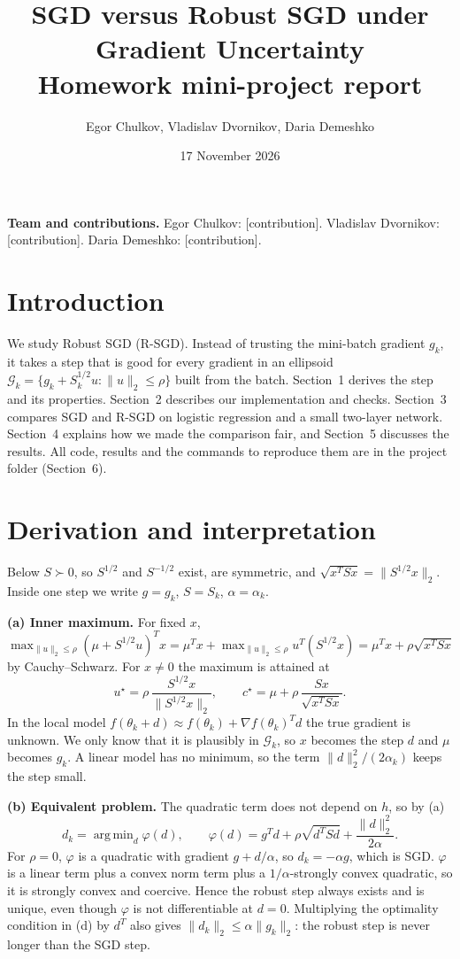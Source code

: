 \documentclass[11pt,a4paper]{article}
\title{SGD versus Robust SGD under Gradient Uncertainty\\[0.2em]\large Homework mini-project report}
\author{Egor Chulkov, Vladislav Dvornikov, Daria Demeshko}
\date{17 November 2026}
\newcommand{\G}{\mathcal{G}_k}
\newcommand{\norm}[1]{\lVert #1\rVert_2}
\DeclareMathOperator*{\argmin}{arg\,min}
\begin{document}
\maketitle

\noindent\textbf{Team and contributions.}
Egor Chulkov: [contribution].
Vladislav Dvornikov: [contribution].
Daria Demeshko: [contribution].

\section*{Introduction}

We study Robust SGD (R-SGD). Instead of trusting the mini-batch gradient $g_k$, it takes a step
that is good for every gradient in an ellipsoid $\G=\{g_k+S_k^{1/2}u:\norm u\le\rho\}$ built from
the batch. Section~1 derives the step and its properties. Section~2 describes our implementation and
checks. Section~3 compares SGD and R-SGD on logistic regression and a small two-layer network.
Section~4 explains how we made the comparison fair, and Section~5 discusses the results. All code,
results and the commands to reproduce them are in the project folder (Section~6).

\section{Derivation and interpretation}

Below $S\succ0$, so $S^{1/2}$ and $S^{-1/2}$ exist, are symmetric, and $\sqrt{x^TSx}=\norm{S^{1/2}x}$.
Inside one step we write $g=g_k$, $S=S_k$, $\alpha=\alpha_k$.

\textbf{(a) Inner maximum.} For fixed $x$,
$\max_{\norm u\le\rho}(\mu+S^{1/2}u)^Tx=\mu^Tx+\max_{\norm u\le\rho}u^T(S^{1/2}x)=\mu^Tx+\rho\sqrt{x^TSx}$
by Cauchy--Schwarz. For $x\ne0$ the maximum is attained at
\begin{equation*}
u^\star=\rho\,\frac{S^{1/2}x}{\norm{S^{1/2}x}},\qquad c^\star=\mu+\rho\,\frac{Sx}{\sqrt{x^TSx}} .
\end{equation*}
In the local model $f(\theta_k+d)\approx f(\theta_k)+\nabla f(\theta_k)^Td$ the true gradient is unknown.
We only know that it is plausibly in $\G$, so $x$ becomes the step $d$ and $\mu$ becomes $g_k$. A
linear model has no minimum, so the term $\norm d^2/(2\alpha_k)$ keeps the step small.

\textbf{(b) Equivalent problem.} The quadratic term does not depend on $h$, so by (a)
\begin{equation*}
d_k=\argmin_d\varphi(d),\qquad \varphi(d)=g^Td+\rho\sqrt{d^TSd}+\frac{\norm d^2}{2\alpha}. \tag{2}
\end{equation*}
For $\rho=0$, $\varphi$ is a quadratic with gradient $g+d/\alpha$, so $d_k=-\alpha g$, which is SGD.
$\varphi$ is a linear term plus a convex norm term plus a $1/\alpha$-strongly convex quadratic, so it is
strongly convex and coercive. Hence the robust step always exists and is unique, even though $\varphi$
is not differentiable at $d=0$. Multiplying the optimality condition in (d) by $d^T$ also gives
$\norm{d_k}\le\alpha\norm{g_k}$: the robust step is never longer than the SGD step.
\end{document}
